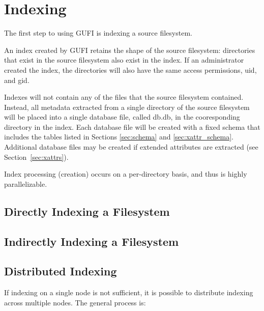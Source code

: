 \section{Indexing}
The first step to using GUFI is indexing a source filesystem.

An index created by GUFI retains the shape of the source filesystem:
directories that exist in the source filesystem also exist in the
index. If an administrator created the index, the directories will
also have the same access permissions, uid, and gid.

Indexes will not contain any of the files that the source filesystem
contained. Instead, all metadata extracted from a single directory of
the source filesystem will be placed into a single database file,
called db.db, in the cooresponding directory in the index. Each
database file will be created with a fixed schema that includes the
tables listed in Sections \ref{sec:schema} and
\ref{sec:xattr_schema}. Additional database files may be created if
extended attributes are extracted (see Section~\ref{sec:xattrs}).

Index processing (creation) occurs on a per-directory basis, and thus
is highly parallelizable.

\subsection{Directly Indexing a Filesystem}

\subsection{Indirectly Indexing a Filesystem}




\subsection{Distributed Indexing}
If indexing on a single node is not sufficient, it is possible to
distribute indexing across multiple nodes. The general process is:

